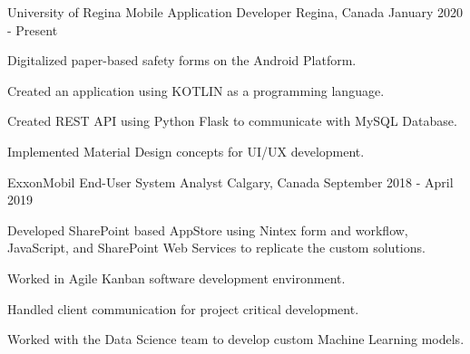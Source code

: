 

\begin{cventries}
  \cventry
    {University of Regina} %
    {Mobile Application Developer} %
    {Regina, Canada} %
    {January 2020 - Present} %
    {
      \begin{cvitems} %
        \item {Digitalized paper-based safety forms on the Android Platform.}
        \item {Created an application using KOTLIN as a programming language.}
        \item {Created REST API using Python Flask to communicate with MySQL Database.}
        \item {Implemented Material Design concepts for UI/UX development.}
      \end{cvitems}
    }

  \cventry
    {ExxonMobil} %
    {End-User System Analyst} %
    {Calgary, Canada} %
    {September 2018 - April 2019} %
    {
      \begin{cvitems} %
        \item {Developed SharePoint based AppStore using Nintex form and workflow, JavaScript, and SharePoint Web Services to replicate the custom solutions.}
        \item {Worked in Agile Kanban software development environment.}
        \item {Handled client communication for project critical development.}
        \item {Worked with the Data Science team to develop custom Machine Learning models.}
      \end{cvitems}
    }




\end{cventries}
